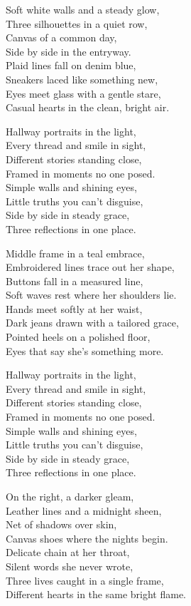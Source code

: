 \begin{lyrics}
Soft white walls and a steady glow,\\
Three silhouettes in a quiet row,\\
Canvas of a common day,\\
Side by side in the entryway.\\
Plaid lines fall on denim blue,\\
Sneakers laced like something new,\\
Eyes meet glass with a gentle stare,\\
Casual hearts in the clean, bright air.

Hallway portraits in the light,\\
Every thread and smile in sight,\\
Different stories standing close,\\
Framed in moments no one posed.\\
Simple walls and shining eyes,\\
Little truths you can't disguise,\\
Side by side in steady grace,\\
Three reflections in one place.

Middle frame in a teal embrace,\\
Embroidered lines trace out her shape,\\
Buttons fall in a measured line,\\
Soft waves rest where her shoulders lie.\\
Hands meet softly at her waist,\\
Dark jeans drawn with a tailored grace,\\
Pointed heels on a polished floor,\\
Eyes that say she’s something more.

Hallway portraits in the light,\\
Every thread and smile in sight,\\
Different stories standing close,\\
Framed in moments no one posed.\\
Simple walls and shining eyes,\\
Little truths you can't disguise,\\
Side by side in steady grace,\\
Three reflections in one place.

On the right, a darker gleam,\\
Leather lines and a midnight sheen,\\
Net of shadows over skin,\\
Canvas shoes where the nights begin.\\
Delicate chain at her throat,\\
Silent words she never wrote,\\
Three lives caught in a single frame,\\
Different hearts in the same bright flame.


\end{lyrics}
